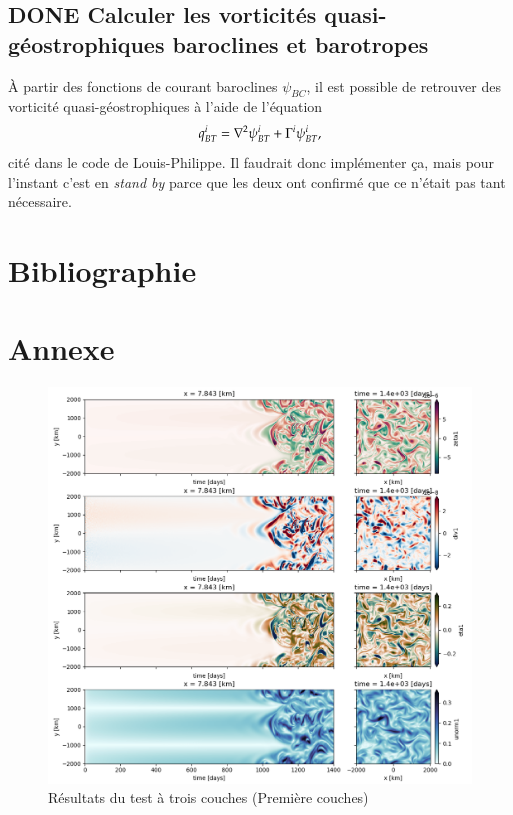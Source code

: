 \documentclass[10pt]{article}
\numberwithin{equation}{section}
\begin{document}
\subsection{{\bfseries\sffamily DONE} Calculer les vorticités quasi-géostrophiques baroclines et barotropes}
\label{sec:org6569089}
À partir des fonctions de courant baroclines \(\psi_{BC}\), il est possible de retrouver des vorticité quasi-géostrophiques à l'aide de l'équation
\begin{equation}
q_{BT}^i = \laplacian \psi_{BT}^i + \Gamma^i \psi_{BT}^i,
\end{equation}
cité dans le code de Louis-Philippe.
Il faudrait donc implémenter ça, mais pour l'instant c'est en \emph{stand by} parce que les deux ont confirmé que ce n'était pas tant nécessaire.


\section{Bibliographie}
\label{sec:org538da6b}


\section{Annexe}
\label{sec:org63fd623}

\begin{figure}[htbp]
\centering
\includegraphics[width=.9\linewidth]{figures/tests/2023-04-08_test1.png}
\caption{\label{fig:org821be30}Résultats du test à trois couches (Première couches)}
\end{figure}
\end{document}
